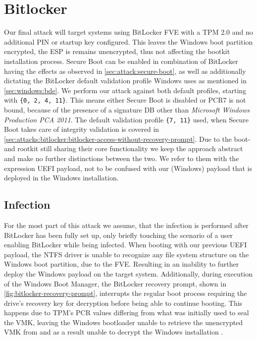 \section{Bitlocker}

Our final attack will target systems using BitLocker \ac{FVE} with a \ac{TPM} 2.0 and no additional PIN or startup key configured.
This leaves the Windows boot partition encrypted, the \ac{ESP} is remains unencrypted, thus not affecting the bootkit installation process.
Secure Boot can be enabled in combination of BitLocker having the effects as observed in \autoref{sec:attack:secure-boot}, as well as additionally dictating the BitLocker default validation profile Windows uses as mentioned in \autoref{sec:windows:bde}.
We perform our attack against both default profiles, starting with \lstinline|{0, 2, 4, 11}|.
This means either Secure Boot is disabled or \ac{PCR}7 is not bound, because of the presence of a signature \ac{DB} other than \emph{Microsoft Windows Production PCA 2011}.
The default validation profile \lstinline|{7, 11}| used, when Secure Boot takes care of integrity validation is covered in \autoref{sec:attacks:bitlocker:bitlocker-access-without-recovery-prompt}.
Due to the boot- and rootkit still sharing their core functionality we keep the approach abstract and make no further distinctions between the two.
We refer to them with the expression \ac{UEFI} payload, not to be confused with our (Windows) payload that is deployed in the Windows installation.


\subsection{Infection}

For the most part of this attack we assume, that the infection is performed after BitLocker has been fully set up, only briefly touching the scenario of a user enabling BitLocker while being infected.
When booting with our previous \ac{UEFI} payload, the \ac{NTFS} driver is unable to recognize any file system structure  on the Windows boot partition, due to the \ac{FVE}.
Resulting in an inability to further deploy the Windows payload on the target system.
Additionally, during execution of the Windows Boot Manager, the BitLocker recovery prompt, shown in \autoref{fig:bitlocker-recovery-prompt}, interrupts the regular boot process requiring the drive's recovery key for decryption before being able to continue booting.
This happens due to \ac{TPM}'s \ac{PCR} values differing from what was initially used to seal the \ac{VMK}, leaving the Windows bootloader unable to retrieve the unencrypted \ac{VMK} from and as a result unable to decrypt the Windows installation \cite[12.]{windows-internals-7-part2}.

